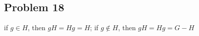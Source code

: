 \subsection*{Problem 18}
\noindent if $g \in H$, then $gH = Hg = H$; if $g \notin H$, then $gH = Hg = G - H$

